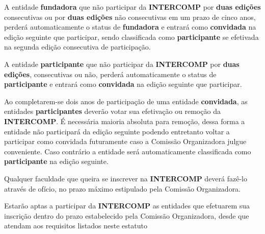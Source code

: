 \begin{article}
	\begin{xparagraph}
		A entidade \textbf{fundadora} que não participar da \textbf{INTERCOMP} por \textbf{duas edições} consecutivas ou por \textbf{duas edições} não consecutivas em um prazo de cinco anos, perderá automaticamente o status de \textbf{fundadora} e entrará como \textbf{convidada} na edição seguinte que participar, sendo classificada como \textbf{participante} se efetivada na segunda edição consecutiva de participação.
	\end{xparagraph}

	\begin{xparagraph}
		A entidade \textbf{participante} que não participar da \textbf{INTERCOMP} por \textbf{duas edições}, consecutivas ou não, perderá automaticamente o status de \textbf{participante} e entrará como \textbf{convidada} na edição seguinte que participar.
	\end{xparagraph}
\end{article}

\begin{article}
	Ao completarem-se dois anos de participação de uma entidade \textbf{convidada}, as entidades \textbf{participantes} deverão votar sua efetivação ou remoção da \textbf{INTERCOMP}. É necessária maioria absoluta para remoção, dessa forma a entidade não participará da edição seguinte podendo entretanto voltar a participar como convidada futuramente caso a Comissão Organizadora julgue conveniente. Caso contrário a entidade será automaticamente classificada como \textbf{participante} na edição seguinte.
\end{article}

\begin{article}
	Qualquer faculdade que queira se inscrever na \textbf{INTERCOMP} deverá fazê-lo através de ofício, no prazo máximo estipulado pela Comissão Organizadora.
\end{article}

\begin{article}
	Estarão aptas a participar da \textbf{INTERCOMP} as entidades que efetuarem sua inscrição dentro do prazo estabelecido pela Comissão Organizadora, desde que atendam aos requisitos listados neste estatuto
\end{article}
